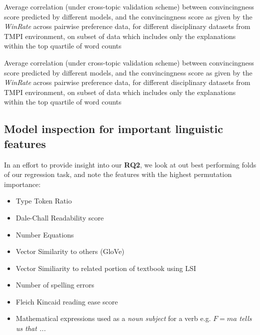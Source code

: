 \documentclass[notitlepage,12pt]{jedm}
\begin{document}
\begin{table}
	\parbox{.45\linewidth}{
		\centering
		
	}
	\hfill
	\parbox{.45\linewidth}{
		\centering
		
	}
	\caption{
		Average correlation (under cross-topic validation scheme) between 
		convincingness score predicted by different models, and the 
		convincingness score as given by the \textit{WinRate} across pairwise 
		preference data, for different disciplinary datasets from TMPI 
		environment, on subset of data which includes only the explanations 
		within the top quartile of word counts
	}
	\label{tab:dalite_winrate_longest}
\end{table}


\begin{table}
	\parbox{.45\linewidth}{
		\centering
		
	}
	\hfill
	\parbox{.45\linewidth}{
		\centering
		
	}
	\caption{
		Average correlation (under cross-topic validation scheme) between 
		convincingness score predicted by different models, and the 
		convincingness score as given by the \textit{WinRate} across pairwise 
		preference data, for different disciplinary datasets from TMPI 
		environment, on subset of data which includes only the explanations 
		within the top quartile of word counts
	}
	\label{tab:dalite_BT_longest}
\end{table}


\subsection{Model inspection for important linguistic features}
In an effort to provide insight into our \textbf{RQ2}, we look at out best 
performing folds of our regression task, and note the features with the highest 
permutation importance:

\begin{itemize}
	\item Type Token Ratio
	\item Dale-Chall Readability score
	\item Number Equations
	\item Vector Similarity to others (GloVe)
	\item Vector Similiarity to related portion of textbook using LSI
	\item Number of spelling errors
	\item Fleich Kincaid reading ease score
	\item Mathematical expressions used as a \textit{noun subject} for a verb  
	e.g. $F=ma$ \textit{tells us that ...}
\end{itemize}
\end{document}
